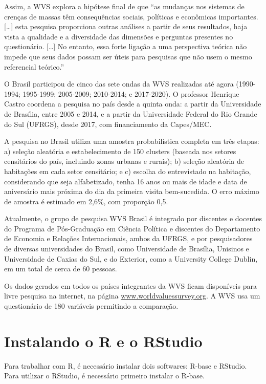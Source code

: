 \documentclass[
  10pt,
  brazil,
  a4paper,
  twoside, notitlepage, openright]{book}
\begin{document}
Assim, a WVS explora a hipótese final de que ``as mudanças nos sistemas de crenças de massas têm consequências sociais, políticas e econômicas importantes. {[}\ldots{]} esta pesquisa proporciona outras análises a partir de seus resultados, haja vista a qualidade e a diversidade das dimensões e perguntas presentes no questionário. {[}\ldots{]} No entanto, essa forte ligação a uma perspectiva teórica não impede que seus dados possam ser úteis para pesquisas que não usem o mesmo referencial teórico.'' \citep{castro_conteudo_2015}

O Brasil participou de cinco das sete ondas da WVS realizadas até agora (1990-1994; 1995-1999; 2005-2009; 2010-2014; e 2017-2020). O professor Henrique Castro coordena a pesquisa no país desde a quinta onda: a partir da Universidade de Brasília, entre 2005 e 2014, e a partir da Universidade Federal do Rio Grande do Sul (UFRGS), desde 2017, com financiamento da Capes/MEC.

A pesquisa no Brasil utiliza uma amostra probabilística completa em três etapas: a) seleção aleatória e estabelecimento de 150 clusters (baseada nos setores censitários do país, incluindo zonas urbanas e rurais); b) seleção aleatória de habitações em cada setor censitário; e c) escolha do entrevistado na habitação, considerando que seja alfabetizado, tenha 16 anos ou mais de idade e data de aniversário mais próxima do dia da primeira visita bem-sucedida. O erro máximo de amostra é estimado em 2,6\%, com proporção 0,5.

Atualmente, o grupo de pesquisa WVS Brasil é integrado por discentes e docentes do Programa de Pós-Graduação em Ciência Política e discentes do Departamento de Economia e Relações Internacionais, ambos da UFRGS, e por pesquisadores de diversas universidades do Brasil, como Universidade de Brasília, Unisinos e Universidade de Caxias do Sul, e do Exterior, como a University College Dublin, em um total de cerca de 60 pessoas.

Os dados gerados em todos os países integrantes da WVS ficam disponíveis para livre pesquisa na internet, na página \url{www.worldvaluessurvey.org}. A WVS usa um questionário de 180 variáveis permitindo a comparação.

\hypertarget{instalando-o-r-e-o-rstudio}{%
\chapter{Instalando o R e o RStudio}\label{instalando-o-r-e-o-rstudio}}

Para trabalhar com R, é necessário instalar dois softwares: R-base e RStudio. Para utilizar o RStudio, é necessário primeiro instalar o R-base.
\end{document}
